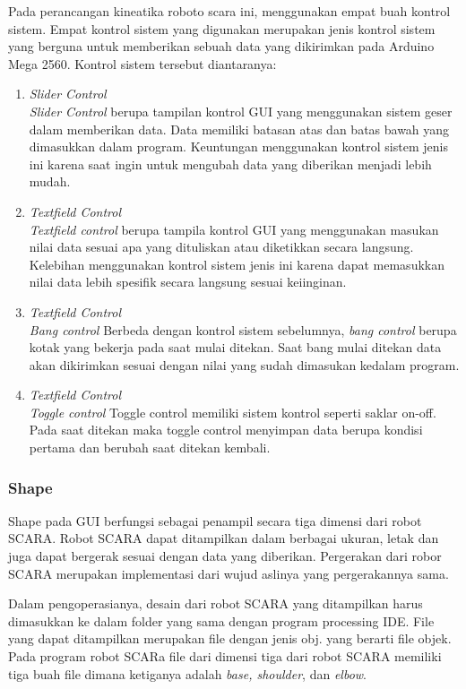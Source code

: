 Pada perancangan kineatika roboto scara ini, menggunakan empat buah kontrol sistem. Empat kontrol sistem yang digunakan merupakan jenis kontrol sistem yang berguna untuk memberikan sebuah data yang dikirimkan pada Arduino Mega 2560. Kontrol sistem tersebut diantaranya:
\begin{enumerate}
	\item \textit{Slider Control} \\
	\textit{Slider Control} berupa tampilan kontrol GUI yang menggunakan sistem geser dalam memberikan data. Data memiliki batasan atas dan batas bawah yang dimasukkan dalam program. Keuntungan menggunakan kontrol sistem jenis ini karena saat ingin untuk mengubah data yang diberikan menjadi lebih mudah.


	\item \textit{Textfield Control} \\
\textit{Textfield control} berupa tampila kontrol GUI yang menggunakan masukan nilai data sesuai apa yang dituliskan atau diketikkan secara langsung. Kelebihan menggunakan kontrol sistem jenis ini karena dapat memasukkan nilai data lebih spesifik secara langsung sesuai keiinginan.
	
	\item \textit{Textfield Control} \\
\textit{Bang control}
Berbeda dengan kontrol sistem sebelumnya,\textit{ bang control }berupa kotak yang bekerja pada saat mulai ditekan. Saat bang mulai ditekan data akan dikirimkan sesuai dengan nilai yang sudah dimasukan kedalam program. 
	

	\item \textit{Textfield Control} \\
\textit{Toggle control}
Toggle control memiliki sistem kontrol seperti saklar on-off. Pada saat ditekan maka toggle control menyimpan data berupa kondisi pertama dan berubah saat ditekan kembali. 

\end{enumerate}
\subsubsection{Shape}
Shape pada GUI berfungsi sebagai penampil secara tiga dimensi dari robot SCARA. Robot SCARA dapat ditampilkan dalam berbagai ukuran, letak dan juga dapat bergerak sesuai dengan data yang diberikan. Pergerakan dari robor SCARA merupakan implementasi dari wujud aslinya yang pergerakannya sama.

Dalam pengoperasianya, desain dari robot SCARA yang ditampilkan harus dimasukkan ke dalam folder yang sama dengan program processing IDE. File yang dapat ditampilkan merupakan file dengan jenis obj. yang berarti file objek. Pada program robot SCARa file dari dimensi tiga dari robot SCARA memiliki tiga buah file dimana ketiganya adalah \textit{base, shoulder}, dan \textit{elbow}. 


